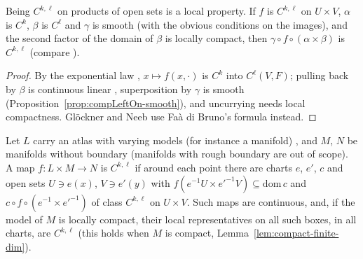 \begin{proposition}
  \label{prop:ckl-chain}
  \leanok
  Being $C^{k,\ell}$ on products of open sets is a local property. If $f$ is $C^{k,\ell}$ on
  $U \times V$, $\alpha$ is $C^k$, $\beta$ is $C^\ell$ and $\gamma$ is smooth (with the obvious
  conditions on the images), and the second factor of the domain of $\beta$ is locally compact,
  then $\gamma \circ f \circ (\alpha \times \beta)$ is $C^{k,\ell}$
  (compare \cite[Props.~1.7.26, 1.7.28]{GN26}).
\end{proposition}

\begin{proof}
  \leanok
  By the exponential law \cite[Thm.~1.7.30]{GN26}, $x \mapsto f(x, \cdot)$ is $C^k$ into
  $C^\ell(V, F)$; pulling back by $\beta$ is continuous linear \cite[Prop.~1.7.11]{GN26},
  superposition by $\gamma$ is smooth (Proposition~\ref{prop:compLeftOn-smooth}), and uncurrying
  needs local compactness. Glöckner and Neeb use Faà di Bruno's formula instead.
\end{proof}

\begin{definition}
  \label{def:ckl-manifold}
  \leanok
  Let $L$ carry an atlas with varying models (for instance a manifold)
  \cite[Remark~3.5.28]{GN26}, and $M$, $N$ be manifolds without boundary (manifolds with rough
  boundary are out of scope). A map $f \colon L \times M \to N$ is $C^{k,\ell}$ if around
  each point there are charts $e$, $e'$, $c$ and open sets $U \ni e(x)$, $V \ni e'(y)$ with
  $f(e^{-1}U \times e'^{-1} V) \subseteq \mathrm{dom}\, c$ and
  $c \circ f \circ (e^{-1} \times e'^{-1})$ of class $C^{k,\ell}$ on $U \times V$. Such maps are
  continuous, and, if the model of $M$ is locally compact, their local representatives on all such
  boxes, in all charts, are $C^{k,\ell}$ \cite[Remark~3.5.26(a)]{GN26} (this holds when $M$ is
  compact, Lemma~\ref{lem:compact-finite-dim}).
\end{definition}

